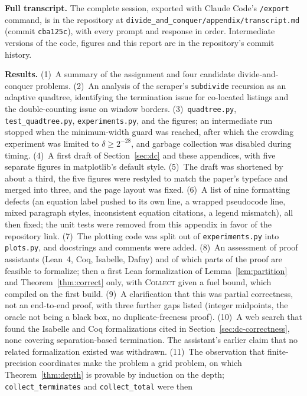 \textbf{Full transcript.} The complete session, exported with Claude Code's
\texttt{/export} command, is in the repository at
\texttt{divide\_and\_conquer/appendix/transcript.md}
(commit \texttt{cba125c}), with every prompt and response in order.
Intermediate versions of the code, figures and this report are in the
repository's commit history.

\textbf{Results.}
(1)~A summary of the assignment and four candidate divide-and-conquer problems.
(2)~An analysis of the scraper's \texttt{subdivide} recursion as an adaptive
quadtree, identifying the termination issue for co-located listings and the
double-counting issue on window borders.
(3)~\texttt{quadtree.py}, \texttt{test\_quadtree.py}, \texttt{experiments.py},
and the figures; an intermediate run stopped when the minimum-width guard was
reached, after which the crowding experiment was limited to
$\delta\ge2^{-28}$, and garbage collection was disabled during timing.
(4)~A first draft of Section~\ref{sec:dc} and these appendices, with five
separate figures in matplotlib's default style.
(5)~The draft was shortened by about a third, the five figures were
restyled to match the paper's typeface and merged into three, and the page
layout was fixed.
(6)~A list of nine formatting defects (an equation label pushed to its own
line, a wrapped pseudocode line, mixed paragraph styles, inconsistent
equation citations, a legend mismatch), all then fixed; the unit tests were
removed from this appendix in favor of the repository link.
(7)~The plotting code was split out of \texttt{experiments.py} into
\texttt{plots.py}, and docstrings and comments were added.
(8)~An assessment of proof assistants (Lean~4, Coq, Isabelle, Dafny) and of
which parts of the proof are feasible to formalize; then a first Lean
formalization of Lemma~\ref{lem:partition} and Theorem~\ref{thm:correct}
only, with \textsc{Collect} given a fuel bound, which compiled on the first
build.
(9)~A clarification that this was partial correctness, not an end-to-end
proof, with three further gaps listed (integer midpoints, the oracle not being
a black box, no duplicate-freeness proof).
(10)~A web search that found the Isabelle and Coq formalizations cited in
Section~\ref{sec:dc-correctness}, none covering separation-based termination.
The assistant's earlier claim that no related formalization existed was
withdrawn.
(11)~The observation that finite-precision coordinates make the problem a
grid problem, on which Theorem~\ref{thm:depth} is provable by induction on the
depth; \texttt{collect\_terminates} and \texttt{collect\_total} were then
